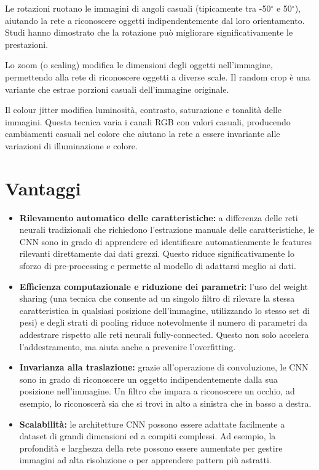 \documentclass[a4paper,12pt]{report}
\begin{document}
	Le rotazioni ruotano le immagini di angoli casuali (tipicamente tra -50$^\circ$ e 50$^\circ$), aiutando la rete a riconoscere oggetti indipendentemente dal loro orientamento. Studi hanno dimostrato che la rotazione può migliorare significativamente le prestazioni.
	
	Lo zoom (o scaling) modifica le dimensioni degli oggetti nell'immagine, permettendo alla rete di riconoscere oggetti a diverse scale. Il random crop è una variante che estrae porzioni casuali dell'immagine originale.
	
	Il colour jitter modifica luminosità, contrasto, saturazione e tonalità delle immagini. Questa tecnica varia i canali RGB con valori casuali, producendo cambiamenti casuali nel colore che aiutano la rete a essere invariante alle variazioni di illuminazione e colore.
	
	\section{Vantaggi}
	
	\begin{itemize}
		\item \textbf{Rilevamento automatico delle caratteristiche:} a differenza delle reti neurali tradizionali che richiedono l'estrazione manuale delle caratteristiche, le CNN sono in grado di apprendere ed identificare automaticamente le features rilevanti direttamente dai dati grezzi. Questo riduce significativamente lo sforzo di pre-processing e permette al modello di adattarsi meglio ai dati.
		\item \textbf{Efficienza computazionale e riduzione dei parametri:} l'uso del weight sharing (una tecnica che consente ad un singolo filtro di rilevare la stessa caratteristica in qualsiasi posizione dell'immagine, utilizzando lo stesso set di pesi) e degli strati di pooling riduce notevolmente il numero di parametri da addestrare rispetto alle reti neurali fully-connected. Questo non solo accelera l'addestramento, ma aiuta anche a prevenire l'overfitting.
		\item \textbf{Invarianza alla traslazione:} grazie all'operazione di convoluzione, le CNN sono in grado di riconoscere un oggetto indipendentemente dalla sua posizione nell'immagine. Un filtro che impara a riconoscere un occhio, ad esempio, lo riconoscerà sia che si trovi in alto a sinistra che in basso a destra.
		\item \textbf{Scalabilità:} le architetture CNN possono essere adattate facilmente a dataset di grandi dimensioni ed a compiti complessi. Ad esempio, la profondità e larghezza della rete possono essere aumentate per gestire immagini ad alta risoluzione o per apprendere pattern più astratti.
	\end{itemize}
	
\end{document}
